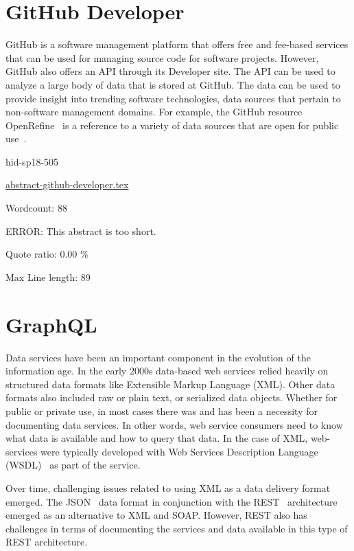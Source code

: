 \section{GitHub Developer}

GitHub is a software management platform that offers free and fee-based
services that can be used for managing source code for software projects.
However, GitHub also offers an API through its Developer site.  The API
can be used to analyze a large body of data that is stored at GitHub.  The
data can be used to provide insight into trending software technologies, data
sources that pertain to non-software management domains.  For example, the
GitHub resource OpenRefine~\cite{hid-sp18-505-OpenRefine2018} is a reference
to a variety of data sources that are open for public use~\cite{hid-sp18-505-GitHub2018}.


\begin{IU}

hid-sp18-505

\href{https://github.com/cloudmesh-community/hid-sp18-505/blob/master//technology/abstract-github-developer.tex}{abstract-github-developer.tex}

 

Wordcount: 88

ERROR: This abstract is too short.


Quote ratio: 0.00 \%
 
Max Line length: 89
\end{IU}

\section{GraphQL}

Data services have been an important component in the evolution of the
information age.  In the early 2000s data-based web services relied
heavily on structured data formats like Extensible Markup
Language (XML).  Other data formats also included raw or plain text, or
serialized data objects.  Whether for public or private use, in most
cases there was and has been a necessity for documenting data
services.  In other words, web service consumers need to know what
data is available and how to query that data.  In the case of XML,
web-services were typically developed with
Web Services Description Language (WSDL)~\cite{hid-sp18-505-WSDL2018} as part
of the service.

Over time, challenging issues related to using XML as a data delivery format
emerged.  The JSON~\cite{hid-sp18-505-JSON2018} data format in
conjunction with the REST~\cite{hid-sp18-505-REST2018} architecture emerged
as an alternative to XML and SOAP.  However, REST also has challenges in terms
of documenting the services and data available in this type of REST
architecture.

